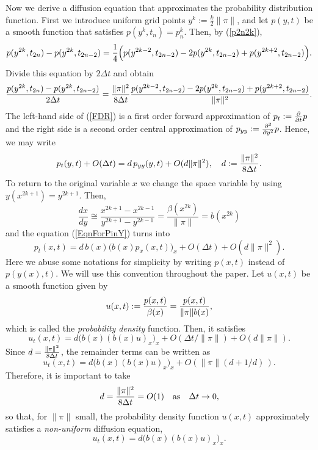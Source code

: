 \documentclass[11pt]{amsart}
\def\d{d}
\begin{document}
Now we derive a diffusion equation that approximates the probability distribution function. First we introduce uniform grid points $y^k := \frac{k}{2}\|\pi\|$, and let $p(y,t)$ be a smooth function that satisfies $p(y^k,t_n)=p^k_n$. Then, by (\ref{p2n2k}),
$$
{p(y^{2k},t_{2n})-p(y^{2k},t_{2n-2})} ={1\over 4} \Big(p(y^{2k-2},t_{2n-2})-2p(y^{2k},t_{2n-2})+p(y^{2k+2},t_{2n-2})\Big).
$$
Divide this equation by $2\Delta t$ and obtain
\begin{equation}\label{FDR}
\begin{split}
{p(y^{2k},t_{2n})-p(y^{2k},t_{2n-2})\over 2\Delta t}
={\|\pi\|^2\over 8\Delta t} {p(y^{2k-2},t_{2n-2})-2p(y^{2k},t_{2n-2})+p(y^{2k+2},t_{2n-2}) \over \|\pi\|^2}.
\end{split}
\end{equation}
The left-hand side of (\ref{FDR}) is a first order forward approximation of $p_t:={\partial\over\partial t}p$ and the right side is a second order central approximation of $p_{yy}:={\partial^2\over\partial y^2}p$. Hence, we may write
\begin{equation}\label{EqnForPinY}
p_t(y,t)+O(\Delta t)=\d\,p_{yy}(y,t)+O(\d\|\pi\|^2),\quad \d:={\|\pi\|^2\over 8\Delta t}.
\end{equation}
To return to the original variable $x$ we change the space variable by using $y(x^{2k+1})=y^{2k+1}$. Then,
\begin{equation}\label{b(x)}
\frac{dx}{dy} \cong \frac{x^{2k+1}-x^{2k-1}}{y^{2k+1}-y^{2k-1}} =\frac{\beta(x^{2k})}{\|\pi\|}=b(x^{2k})
\end{equation}
and the equation (\ref{EqnForPinY}) turns into
\begin{equation*}\label{EqnForPinX}
p_t(x,t)=\d\,b(x) \big( b(x)p_x(x,t) \big)_x+O(\Delta t)+O(\d\|\pi\|^2).
\end{equation*}
Here we abuse some notations for simplicity by writing $p(x,t)$ instead of $p(y(x),t)$. We will use this convention throughout the paper. Let $u(x,t)$ be a smooth function given by
\begin{equation}\label{ProbabilityDensity}
u(x,t):={p(x,t)\over\beta(x)} ={p(x,t)\over \|\pi\|b(x)},
\end{equation}
which is called the \emph{probability density} function. Then, it satisfies
\[
u_t(x,t)=\d \big(b(x)(b(x)u)_x)_x+O(\Delta t/\|\pi\|)+O(\d\|\pi\|).
\]
Since $\d={\|\pi\|^2\over 8\Delta t}$, the remainder terms can be written as
\[
u_t(x,t)=\d\big(b(x)(b(x)u)_x)_x+O(\|\pi\|(\d+{1/\d})\,).
\]
Therefore, it is important to take
\begin{equation}\label{diffusivity}
\d={\|\pi\|^2\over 8\Delta t}=O(1)\quad\mbox{as}\quad\Delta t\to0,
\end{equation}
so that, for $\|\pi\|$ small, the probability density function $u(x,t)$ approximately satisfies a \emph{non-uniform} diffusion equation,
\begin{equation}\label{DiffusionEqn1}
u_t(x,t)=\d\big(b(x)(b(x)u)_x)_x.
\end{equation}
\end{document}
